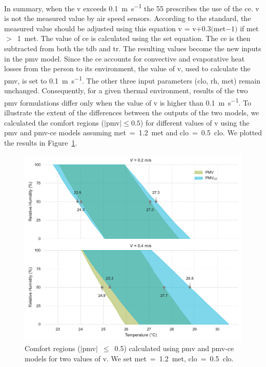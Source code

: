 In summary, when the \ac{v} exceeds \qty{0.1}{\m\per\s} the \gls{55} prescribes the use of the \ac{ce}.
\ac{v} is not the measured value by air speed sensors.
According to the standard, the measured value should be adjusted using this equation \ac{v} = \ac{v}$+ 0.3 ($\acs{met}$-1)$ if \ac{met}~$>$~\qty{1}{met}.
The value of \ac{ce} is calculated using the \ac{set} equation.
The \ac{ce} is then subtracted from both the \ac{tdb} and \ac{tr}.
The resulting values become the new inputs in the \ac{pmv} model.
Since the \ac{ce} accounts for convective and evaporative heat losses from the person to its environment, the value of \ac{v}, used to calculate the \ac{pmv}, is set to \qty{0.1}{\m\per\s}.
The other three input parameters (\ac{clo}, \ac{rh}, \ac{met}) remain unchanged.
Consequently, for a given thermal environment, results of the two \ac{pmv} formulations differ only when the value of \ac{v} is higher than \qty{0.1}{\m\per\s}.
To illustrate the extent of the differences between the outputs of the two models, we calculated the comfort regions ($\mid$\ac{pmv}$\mid \leq 0.5$) for different values of \ac{v} using the \ac{pmv} and \ac{pmv-ce} models assuming \ac{met}~=~\qty{1.2}{met} and \ac{clo}~=~\qty{0.5}{clo}.
We plotted the results in Figure~\ref{fig:comfort_regios_pmv_pmvce}.
\begin{figure}[!htb]
    \centering
    \includegraphics[width=1\textwidth]{figures/pmv_comfort_regions}
    \caption{Comfort regions ($|$\ac{pmv}$|$~$\leq$~\num{0.5}) calculated using \ac{pmv} and \ac{pmv-ce} models for two values of \ac{v}.
    We set \ac{met}~=~\qty{1.2}{met}, \ac{clo}~=~\qty{0.5}{clo}.
    \label{fig:comfort_regios_pmv_pmvce}}
\end{figure}
